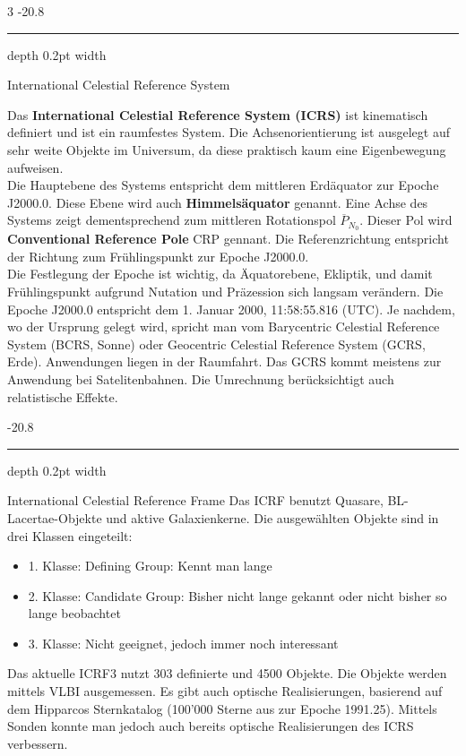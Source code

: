 \documentclass[9pt, landscape, fleqn]{scrartcl}
\makeatletter
\renewcommand{\subsubsection}{\@startsection{subsubsection}{1}{0mm}%
{-2\baselineskip}{0.8\baselineskip}%
{\hrule depth 0.2pt width\columnwidth\vspace*{1.2em}\normalsize\bfseries\rmfamily}}
\makeatother
\begin{document}
\begin{multicols*}{3}
\subsubsection{International Celestial Reference System}

Das \textbf{International Celestial Reference System (ICRS)} ist kinematisch definiert und ist ein raumfestes System. Die Achsenorientierung ist ausgelegt auf sehr weite Objekte im Universum, da diese praktisch kaum eine Eigenbewegung aufweisen. \\

Die Hauptebene des Systems entspricht dem mittleren Erdäquator zur Epoche J2000.0. Diese Ebene wird auch \textbf{Himmelsäquator} genannt. Eine Achse des Systems zeigt dementsprechend zum mittleren Rotationspol $\overline{P}_{N_0}$. Dieser Pol wird \textbf{Conventional Reference Pole} CRP gennant.
Die Referenzrichtung entspricht der Richtung zum Frühlingspunkt zur Epoche J2000.0.\\

Die Festlegung der Epoche ist wichtig, da Äquatorebene, Ekliptik, und damit Frühlingspunkt aufgrund Nutation und Präzession sich langsam verändern.
Die Epoche J2000.0 entspricht dem 1. Januar 2000, 11:58:55.816 (UTC). Je nachdem, wo der Ursprung gelegt wird, spricht man vom Barycentric Celestial Reference System (BCRS, Sonne) oder Geocentric Celestial Reference System (GCRS, Erde). Anwendungen liegen in der Raumfahrt. Das GCRS kommt meistens zur Anwendung bei Satelitenbahnen.
Die Umrechnung berücksichtigt auch relatistische Effekte.

\subsubsection{International Celestial Reference Frame}
Das ICRF benutzt Quasare, BL-Lacertae-Objekte und aktive Galaxienkerne. Die ausgewählten Objekte sind in drei Klassen eingeteilt:
\begin{itemize}
    \item 1. Klasse: Defining Group: Kennt man lange
    \item 2. Klasse: Candidate Group: Bisher nicht lange gekannt oder nicht bisher so lange beobachtet
    \item 3. Klasse: Nicht geeignet, jedoch immer noch interessant
\end{itemize}

Das aktuelle ICRF3 nutzt 303 definierte und 4500 Objekte. Die Objekte werden mittels VLBI ausgemessen. Es gibt auch optische Realisierungen, basierend auf dem Hipparcos Sternkatalog (100'000 Sterne aus zur Epoche 1991.25). Mittels Sonden konnte man jedoch auch bereits optische Realisierungen des ICRS verbessern. \\


\end{multicols*}
\end{document}
